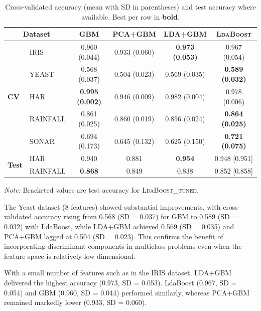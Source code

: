 \documentclass[11pt,a4paper]{article}
\begin{document}
\begin{table}[h!]
\centering
\begingroup
\setlength{\tabcolsep}{5pt}
\renewcommand{\arraystretch}{1.0}
\footnotesize
\caption{Cross-validated accuracy (mean with SD in parentheses) and test accuracy where available.
Best per row in \textbf{bold}.}
\label{tab:classification_results}
\begin{tabular}{@{}llcccc@{}}
\toprule
\multicolumn{2}{c}{\textbf{Dataset}} & \textbf{GBM} & \textbf{PCA+GBM} & \textbf{LDA+GBM} & \textbf{\textsc{LdaBoost}} \\
\midrule
\multirow{5}{*}{\textbf{CV}} 
  & IRIS      & 0.960 (0.044) & 0.933 (0.060) & \textbf{0.973 (0.053)} & 0.967 (0.054) \\
  & YEAST     & 0.568 (0.037) & 0.504 (0.023) & 0.569 (0.035) & \textbf{0.589 (0.032)} \\
  & HAR       & \textbf{0.995 (0.002)} & 0.946 (0.009) & 0.982 (0.004) & 0.978 (0.006) \\
  & RAINFALL      & 0.861 (0.025) & 0.860 (0.019) & 0.856 (0.024) & \textbf{0.864 (0.025)} \\
  & SONAR     & 0.694 (0.173) & 0.645 (0.132) & 0.625 (0.150) & \textbf{0.721 (0.075)} \\
\midrule
\multirow{2}{*}{\textbf{Test}} 
  & HAR       & 0.940 & 0.881 & \textbf{0.954} & 0.948 [0.951] \\
  & RAINFALL      & \textbf{0.868} & 0.849 &  0.838 & 0.852 [0.858] \\
\bottomrule
\end{tabular}
\endgroup

\medskip
\raggedright\footnotesize
\textit{Note:} Bracketed values are test accuracy for \textsc{LdaBoost\_tuned}. 
\end{table}


\bigskip
\noindent
The Yeast dataset (8 features) showed substantial improvements, with cross-validated accuracy rising from 0.568 (SD = 0.037) for GBM to 0.589 (SD = 0.032) with LdaBoost, while LDA+GBM achieved 0.569 (SD = 0.035) and PCA+GBM lagged at 0.504 (SD = 0.023). This confirms the benefit of incorporating discriminant components in multiclass problems even when the feature space is relatively low dimensional.

With a small number of features such as in the IRIS dataset, LDA+GBM delivered the highest accuracy (0.973, SD = 0.053). LdaBoost (0.967, SD = 0.054) and GBM (0.960, SD = 0.044) performed similarly, whereas PCA+GBM remained markedly lower (0.933, SD = 0.060).
\end{document}
